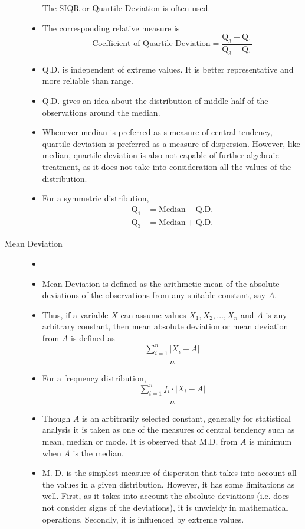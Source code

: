\documentclass[
10pt, %
a4paper, %
]{report}
\begin{document}
\begin{description}
\begin{itemize}
\[\]
The SIQR or Quartile Deviation is often used.
\item The corresponding relative measure is
\[ \text{Coefficient of Quartile Deviation} = \frac{\mathrm{Q}_3 - \mathrm{Q}_1}{\mathrm{Q}_3 + \mathrm{Q}_1} \]
\item Q.D. is independent of extreme values. It is better representative and more reliable than range.
\item Q.D. gives an idea about the distribution of middle half of the observations around the median.
\item Whenever median is preferred as s measure of central tendency, quartile deviation is preferred as a measure of dispersion. However, like median, quartile deviation is also not capable of further algebraic treatment, as it does not take into consideration all the values of the distribution.
\item For a symmetric distribution,
\begin{align*}
\mathrm{Q}_1 &= \text{Median} - \text{Q.D.} \\
\mathrm{Q}_3 &= \text{Median} + \text{Q.D.}
\end{align*}
\end{itemize}
\item[Mean Deviation]
\begin{itemize}
\item[]
\item Mean Deviation is defined as the arithmetic mean of the absolute deviations of the observations from any suitable constant, say \(A\).
\item Thus, if a variable \(X\) can assume values \(X_1, X_2,\dots, X_n\) and \(A\) is any arbitrary constant, then mean absolute deviation or mean deviation from \(A\) is defined as
\[\frac{\sum_{i=1}^n | X_i - A |}{n}\]
\item For a frequency distribution,
\[\frac{\sum_{i=1}^n f_i \cdot | X_i - A |}{n}\]
\item Though \(A\) is an arbitrarily selected constant, generally for statistical analysis it is taken as one of the measures of central tendency such as mean, median or mode. It is observed that M.D. from \(A\) is minimum when \(A\) is the median.
\item M. D. is the simplest measure of dispersion that takes into account all the values in a given distribution. However, it has some limitations as well. First, as it takes into account the absolute deviations (i.e. does not consider signs of the deviations),  it is unwieldy in mathematical operations. Secondly, it is influenced by extreme values.

\end{itemize}
\end{description}
\end{document}
